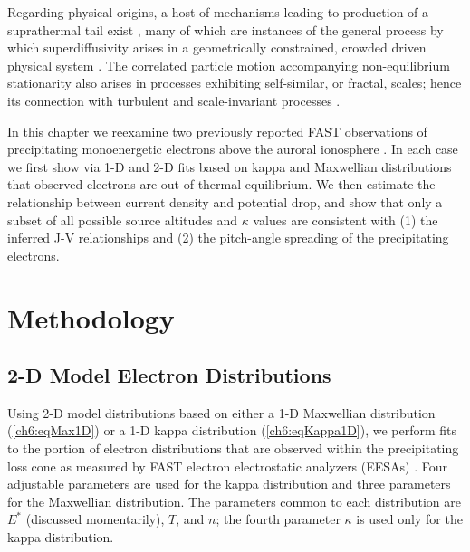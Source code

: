
  \DIFaddend Regarding physical origins, a host of mechanisms leading to production of a
  suprathermal tail exist \citep[e.g., review by][]{Pierrard2010}, many of which
  are instances of the general process by which superdiffusivity arises in a
  geometrically constrained, crowded driven physical system
  \citep{Benichou2013}.  The correlated particle motion accompanying
  non-equilibrium stationarity also arises in processes exhibiting self-similar,
  or fractal, scales; hence its connection with turbulent and scale-invariant
  processes \citep{West1990,Treumann1999a,Leubner2004}.

  In this chapter we reexamine two previously reported FAST observations of
  precipitating monoenergetic electrons above the auroral ionosphere
  \citep{Elphic1998,Ergun1998a}. In each case we first show via 1-D and 2-D fits
  based on kappa and Maxwellian distributions that observed electrons are out of
  thermal equilibrium. We then estimate the relationship between current density
  and potential drop, and show that only a subset of all possible source
  altitudes and $\kappa$ values are consistent with (1) the inferred J-V
  relationships and (2) the pitch-angle spreading of the precipitating
  electrons.

  \section{Methodology}

  \subsection{2-D Model Electron Distributions} \label{ss2D}

  Using 2-D model distributions based on either a 1-D Maxwellian distribution
  (\ref{ch6:eqMax1D}) or a 1-D kappa distribution (\ref{ch6:eqKappa1D}), we
  perform fits to the portion of electron distributions that are observed within
  the precipitating loss cone as measured by FAST electron electrostatic
  analyzers (EESAs) \citep{Carlson2001}. Four adjustable parameters are used for
  the kappa distribution and three parameters for the Maxwellian
  distribution. The parameters common to each distribution are $E^*$ (discussed
  momentarily), $T$, and $n$; the fourth parameter $\kappa$ is used only for the
  kappa distribution.
\DIFdelbegin {}\DIFdelend 

